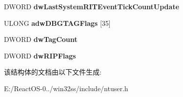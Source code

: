 \begin{DoxyCompactItemize}
D\+W\+O\+RD {\bfseries dw\+Last\+System\+R\+I\+T\+Event\+Tick\+Count\+Update}
\item 
\mbox{\label{struct___p_e_r_u_s_e_r_s_e_r_v_e_r_i_n_f_o_a971476a4d14722168548195f9264bc3f}} 
U\+L\+O\+NG {\bfseries adw\+D\+B\+G\+T\+A\+G\+Flags} \mbox{[}35\mbox{]}
\item 
\mbox{\label{struct___p_e_r_u_s_e_r_s_e_r_v_e_r_i_n_f_o_a9e0dfa70a220e6f747ff473109e5ddee}} 
D\+W\+O\+RD {\bfseries dw\+Tag\+Count}
\item 
\mbox{\label{struct___p_e_r_u_s_e_r_s_e_r_v_e_r_i_n_f_o_ab15f297194d7ff329025d1c60325d87f}} 
D\+W\+O\+RD {\bfseries dw\+R\+I\+P\+Flags}
\end{DoxyCompactItemize}


该结构体的文档由以下文件生成\+:\begin{DoxyCompactItemize}
\item 
E\+:/\+React\+O\+S-\/0../win32ss/include/ntuser.\+h\end{DoxyCompactItemize}
